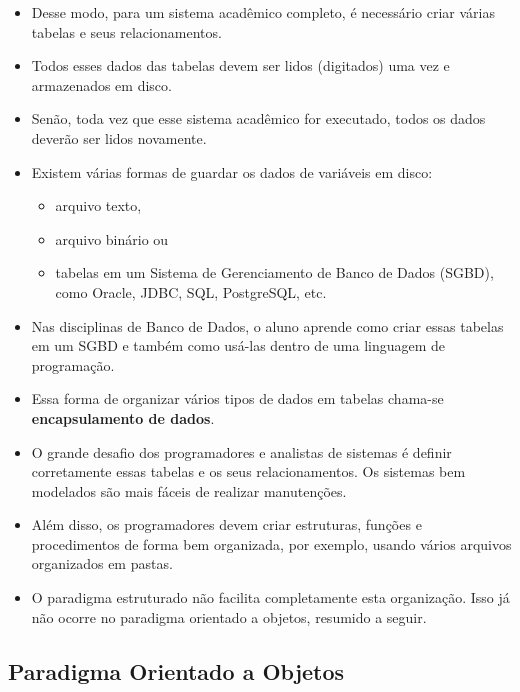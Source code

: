 \documentclass[12pt,a4paper]{article}
\providecommand{\tightlist}{%
      \setlength{\itemsep}{0pt}\setlength{\parskip}{0pt}}
\begin{document}
    \begin{itemize}
\item
  Desse modo, para um sistema acadêmico completo, é necessário criar
  várias tabelas e seus relacionamentos.
\item
  Todos esses dados das tabelas devem ser lidos (digitados) uma vez e
  armazenados em disco.
\item
  Senão, toda vez que esse sistema acadêmico for executado, todos os
  dados deverão ser lidos novamente.
\item
  Existem várias formas de guardar os dados de variáveis em disco:

  \begin{itemize}
  \tightlist
  \item
    arquivo texto,
  \item
    arquivo binário ou
  \item
    tabelas em um Sistema de Gerenciamento de Banco de Dados (SGBD),
    como Oracle, JDBC, SQL, PostgreSQL, etc.
  \end{itemize}
\item
  Nas disciplinas de Banco de Dados, o aluno aprende como criar essas
  tabelas em um SGBD e também como usá-las dentro de uma linguagem de
  programação.
\end{itemize}

    \begin{itemize}
\item
  Essa forma de organizar vários tipos de dados em tabelas chama-se
  \textbf{encapsulamento de dados}.
\item
  O grande desafio dos programadores e analistas de sistemas é definir
  corretamente essas tabelas e os seus relacionamentos. Os sistemas bem
  modelados são mais fáceis de realizar manutenções.
\item
  Além disso, os programadores devem criar estruturas, funções e
  procedimentos de forma bem organizada, por exemplo, usando vários
  arquivos organizados em pastas.
\item
  O paradigma estruturado não facilita completamente esta organização.
  Isso já não ocorre no paradigma orientado a objetos, resumido a
  seguir.
\end{itemize}

    \hypertarget{paradigma-orientado-a-objetos}{%
\subsection{Paradigma Orientado a
Objetos}\label{paradigma-orientado-a-objetos}}
\end{document}
